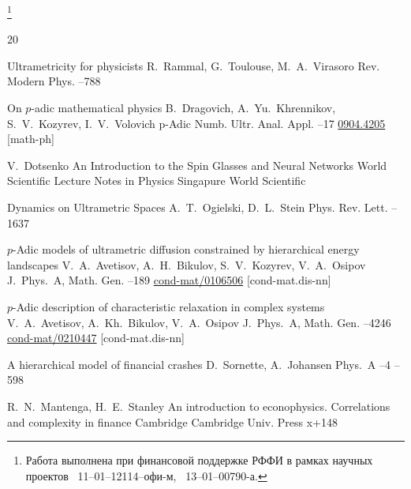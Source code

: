 {\thanks{Работа выполнена  при финансовой поддержке РФФИ в рамках научных проектов  \No~11--01--12114--офи-м,  \No~13--01--00790-а.}

\begin{thebibliography}{20}


\paper  Ultrametricity for physicists
\by R.~Rammal,  G.~Toulouse, M.~A.~Virasoro
\jour Rev. Modern Phys.
--788


\paper On $p$-adic mathematical physics
\by B.~Dragovich, A.~Yu.~Khrennikov, S.~V.~Kozyrev, I.~V.~Volovich
\jour p-Adic Numb. Ultr. Anal. Appl.
--17
\arxiv \href{http://arxiv.org/abs/0904.4205}{0904.4205} [math-ph]


\by V.~Dotsenko
\book An Introduction to the Spin Glasses and Neural Networks
\serial World Scientific Lecture Notes in Physics 
\publaddr Singapure
\publ World Scientific

\paper Dynamics on Ultrametric Spaces
\by A.~T.~Ogielski, D.~L.~Stein
\jour Phys. Rev. Lett.
–1637




\paper $p$-Adic models of ultrametric diffusion constrained by hierarchical energy landscapes
\by V.~A.~Avetisov,  A.~H.~Bikulov,  S.~V.~Kozyrev,  V.~A.~Osipov
\jour J.~Phys.~A, Math. Gen.
--189
\arxiv \href{http://arxiv.org/abs/cond-mat/0106506}{cond-mat/0106506} [cond-mat.dis-nn]



\paper $p$-Adic description of characteristic relaxation in complex systems
\by V.~A.~Avetisov,  A.~Kh.~Bikulov,  V.~A.~Osipov
\jour J.~Phys.~A, Math. Gen.
--4246
\arxiv \href{http://arxiv.org/abs/cond-mat/0210447}{cond-mat/0210447} [cond-mat.dis-nn]


\paper A hierarchical model of financial crashes
\by D.~Sornette, A.~Johansen
\jour Phys.~A
--4
--598


\by R.~N.~Mantenga, H.~E.~Stanley
\book An introduction to econophysics. Correlations and complexity in finance
\publaddr Cambridge
\publ Cambridge Univ. Press
\totalpages x+148



\end{thebibliography}}
